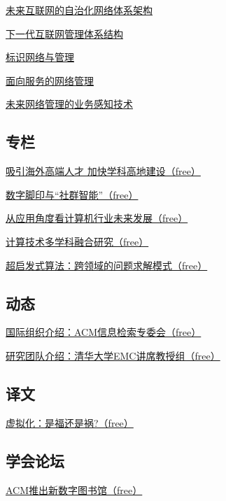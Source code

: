 \documentclass[a4paper]{article}
\begin{document}
\href{http://history.ccf.org.cn/resources/1190201776262/2011/03/23/3.pdf}{未来互联网的自治化网络体系架构}

\href{http://history.ccf.org.cn/resources/1190201776262/2011/03/23/5.pdf}{下一代互联网管理体系结构}

\href{http://history.ccf.org.cn/resources/1190201776262/2011/03/23/4.pdf}{标识网络与管理}

\href{http://history.ccf.org.cn/resources/1190201776262/2011/03/23/6.pdf}{面向服务的网络管理}

\href{http://history.ccf.org.cn/resources/1190201776262/2011/03/23/7.pdf}{未来网络管理的业务感知技术}

\subsection{专栏}
\href{http://history.ccf.org.cn/resources/1190201776262/2011/03/23/9.pdf}{吸引海外高端人才  加快学科高地建设（free）}

\href{http://history.ccf.org.cn/resources/1190201776262/2011/03/23/10.pdf}{数字脚印与“社群智能”（free）}

\href{http://history.ccf.org.cn/resources/1190201776262/2011/03/23/8.pdf}{从应用角度看计算机行业未来发展（free）}

\href{http://history.ccf.org.cn/resources/1190201776262/2011/03/23/11.pdf}{计算技术多学科融合研究（free）}

\href{http://history.ccf.org.cn/resources/1190201776262/2011/03/23/12.pdf}{超启发式算法：跨领域的问题求解模式（free）}

\subsection{动态}
\href{http://history.ccf.org.cn/resources/1190201776262/2011/03/23/14.pdf}{国际组织介绍：ACM信息检索专委会（free）}

\href{http://history.ccf.org.cn/resources/1190201776262/2011/03/23/13.pdf}{研究团队介绍：清华大学EMC讲席教授组（free）}

\subsection{译文}
\href{http://history.ccf.org.cn/resources/1190201776262/2011/03/23/15.pdf}{虚拟化：是福还是祸?（free）}

\subsection{学会论坛}
\href{http://history.ccf.org.cn/resources/1190201776262/2011/03/23/16.pdf}{ACM推出新数字图书馆（free）}
\end{document}
